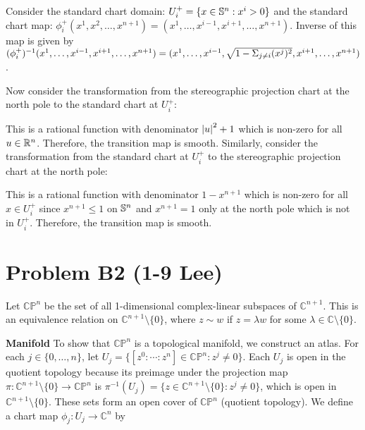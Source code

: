 \documentclass[12pt,letterpaper]{article}
\renewcommand \paragraph[1] {\medskip \noindent \textbf{#1}}
\begin{document}
Consider the standard chart domain: $U_i^+ = \{x \in \symmetric^n : x^i > 0\}$ and the standard chart map: $\phi_i^+ (x^1, x^2, \ldots, x^{n+1}) = (x^1, \ldots, x^{i-1}, x^{i+1}, \ldots, x^{n+1})$. Inverse of this map is given by $(\phi_i^+)^{-1}(x^1, \ldots, x^{i-1}, x^{i+1}, \ldots, x^{n+1}) = (x^1, \ldots, x^{i-1}, \sqrt{1 - \S_{j \neq i} (x^j)^2}, x^{i+1}, \ldots, x^{n+1})$.

Now consider the transformation from the stereographic projection chart at the north pole to the standard chart at $U_i^+$:

This is a rational function with denominator $\abr{u}^2 + 1$ which is non-zero for all $u \in \R^n$. Therefore, the transition map is smooth. Similarly, consider the transformation from the standard chart at $U_i^+$ to the stereographic projection chart at the north pole:

This is a rational function with denominator $1 - x^{n+1}$ which is non-zero for all $x \in U_i^+$ since $x^{n+1} \leq 1$ on $\symmetric^n$ and $x^{n+1} = 1$ only at the north pole which is not in $U_i^+$. Therefore, the transition map is smooth.

\clearpage


\section*{Problem B2 (1-9 Lee)}

Let $\mathbb{CP}^n$ be the set of all 1-dimensional complex-linear subspaces of $\mathbb{C}^{n+1}$. This is an equivalence relation on $\mathbb{C}^{n+1} \setminus \{0\}$, where $z \sim w$ if $z = \lambda w$ for some $\lambda \in \mathbb{C} \setminus \{0\}$.

\paragraph{Manifold}
To show that $\mathbb{CP}^n$ is a topological manifold, we construct an atlas. For each $j \in \{0, \ldots, n\}$, let $U_j = \{[z^0 : \cdots : z^n] \in \mathbb{CP}^n : z^j \neq 0\}$. Each $U_j$ is open in the quotient topology because its preimage under the projection map $\pi: \mathbb{C}^{n+1} \setminus \{0\} \to \mathbb{CP}^n$ is $\pi^{-1}(U_j) = \{z \in \mathbb{C}^{n+1} \setminus \{0\} : z^j \neq 0\}$, which is open in $\mathbb{C}^{n+1} \setminus \{0\}$. These sets form an open cover of $\mathbb{CP}^n$ (quotient topology). We define a chart map $\phi_j: U_j \to \mathbb{C}^n$ by
\end{document}
